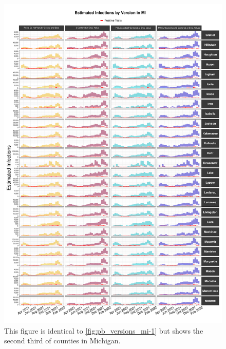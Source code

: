 \documentclass[12pt,twoside]{smiththesis}
\begin{document}
\begin{figure}

{\centering \includegraphics[width=1\linewidth]{figure/mi2_pb_compared_to_observed} 

}

\caption{\label{fig:pb_versions_mi-2} This figure is identical to \ref{fig:pb_versions_mi-1} but shows the second third of counties in Michigan.}\label{fig:unnamed-chunk-119}
\end{figure}
\end{document}

